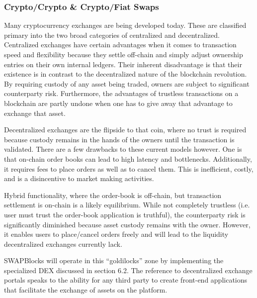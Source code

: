 \documentclass[12pt]{article}
\begin{document}
\subsubsection{Crypto/Crypto \& Crypto/Fiat Swaps}
Many cryptocurrency exchanges are being developed today. These are classified primary into the two broad categories of 
centralized and decentralized. Centralized exchanges have certain advantages when it comes to transaction speed and 
flexibility because they settle off-chain and simply adjust ownership entries on their own internal ledgers. Their 
inherent disadvantage is that their existence is in contrast to the decentralized nature of the blockchain revolution.
By requiring custody of any asset being traded, owners are subject to significant counterparty risk. Furthermore, the 
advantages of trustless transactions on a blockchain are partly undone when one has to give away that advantage to exchange 
that asset.

Decentralized exchanges are the flipside to that coin, where no trust is required because custody remains in 
the hands of the owners until the transaction is validated. There are a few drawbacks to these current models 
however. One is that on-chain order books can lead to high latency and bottlenecks. Additionally, it requires 
fees to place orders as well as to cancel them. This is inefficient, costly, and is a disincentive to market making activities. 

Hybrid functionality, where the order-book is off-chain, but transaction settlement is on-chain is a likely equilibrium. 
While not completely trustless (i.e. user must trust the order-book application is truthful), the counterparty risk is 
significantly diminished because asset custody remains with the owner. However, it enables users to place/cancel orders 
freely and will lead to the liquidity decentralized exchanges currently lack.

SWAPBlocks will operate in this “goldilocks” zone by implementing the specialized DEX discussed in section 6.2. The reference 
to decentralized exchange portals speaks to the ability for any third party to create front-end applications that facilitate 
the exchange of assets on the platform.
\end{document}
